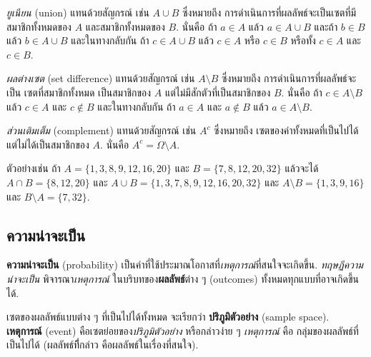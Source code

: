 \textit{ยูเนียน} (union)
 แทนด้วยสัญกรณ์ เช่น $A \cup B$ ซึ่งหมายถึง
การดำเนินการที่ผลลัพธ์จะเป็นเซตที่มีสมาชิกทั้งหมดของ $A$ 
และสมาชิกทั้งหมดของ $B$.
นั่นคือ ถ้า $a \in A$ แล้ว $a \in A \cup B$
และถ้า $b \in B$ แล้ว $b \in A \cup B$
และในทางกลับกัน
ถ้า $c \in A \cup B$ แล้ว $c \in A$ หรือ $c \in B$ หรือทั้ง $c \in A$ และ $c \in B$.

\textit{ผลต่างเซต} (set difference) 
แทนด้วยสัญกรณ์ 
เช่น
$A \setminus B$
ซึ่งหมายถึง
การดำเนินการที่ผลลัพธ์จะเป็น
เซตที่สมาชิกทั้งหมด เป็นสมาชิกของ $A$ 
แต่ไม่มีสักตัวที่เป็นสมาชิกของ $B$.
นั่นคือ ถ้า $c \in A \setminus B$ 
แล้ว $c \in A$ และ $c \notin B$
และในทางกลับกัน
ถ้า $a \in A$ และ $a \notin B$ แล้ว $a \in A \setminus B$.

\textit{ส่วนเติมเต็ม} (complement)
แทนด้วยสัญกรณ์ เช่น $A^c$ 
ซึ่งหมายถึง เซตของค่าทั้งหมดที่เป็นไปได้ แต่ไม่ได้เป็นสมาชิกของ $A$.
นั่นคือ $A^c = \Omega \setminus A$.

ตัวอย่างเช่น ถ้า $A = \{1, 3, 8, 9, 12, 16, 20\}$
และ $B = \{7, 8, 12, 20, 32\}$ แล้วจะได้\\
$A \cap B = \{8, 12, 20\}$
และ
$A \cup B = \{1, 3, 7, 8, 9, 12, 16, 20, 32\}$
และ
$A \setminus B = \{1, 3, 9, 16\}$
และ $B \setminus A = \{7, 32\}$.

\subsection{ความน่าจะเป็น}
\label{sec: probability main}

\textbf{ความน่าจะเป็น} (probability) เป็นค่าที่ใช้ประมาณโอกาสที่\textit{เหตุการณ์}ที่สนใจจะเกิดขึ้น.
%
\textit{ทฤษฏีความน่าจะเป็น}
พิจารณา\textit{เหตุการณ์}
ในบริบทของ\textbf{ผลลัพธ์}ต่าง ๆ (outcomes) ทั้งหมดทุกแบบที่อาจเกิดขึ้นได้.

เซตของผลลัพธ์แบบต่าง ๆ ที่เป็นไปได้ทั้งหมด
จะเรียกว่า \textbf{ปริภูมิตัวอย่าง} (sample space).
\textbf{เหตุการณ์} (event) คือเซตย่อยของ\textit{ปริภูมิตัวอย่าง}
หรือกล่าวง่าย ๆ
\textit{เหตุการณ์}
คือ กลุ่มของผลลัพธ์ที่เป็นไปได้ (ผลลัพธ์ทีี่กล่าว คือผลลัพธ์ในเรื่องที่สนใจ).


